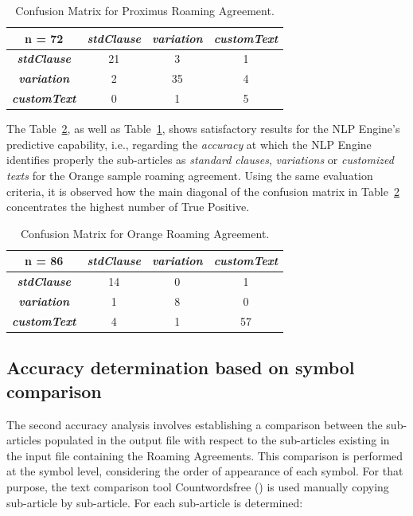 \documentclass[conference]{style/IEEEtran}
\begin{document}
\begin{table}[htbp]
\caption{Confusion Matrix for Proximus Roaming Agreement.}
\begin{center}
\begin{tabular}{|c|c|c|c|}
\hline
\textbf{n = 72} & \textbf{\textit{stdClause}}& \textbf{\textit{variation}}& \textbf{\textit{customText}} \\
\hline
\textbf{\textit{stdClause}}& 21 & 3 & 1 \\
\hline
\textbf{\textit{variation}}& 2 & 35 & 4 \\
\hline
\textbf{\textit{customText}}& 0 & 1 & 5 \\
\hline
\end{tabular}
\label{table1}
\end{center}
\end{table}

The Table~\ref{table2}, as well as Table~\ref{table1}, shows satisfactory results for the NLP Engine's predictive capability, i.e., regarding the \textit{accuracy} at which the NLP Engine identifies properly the sub-articles as \textit{standard clauses}, \textit{variations} or \textit{customized texts} for the Orange sample roaming agreement. Using the same evaluation criteria, it is observed how the main diagonal of the confusion matrix in Table~\ref{table2} concentrates the highest number of True Positive.

\begin{table}[htbp]
\caption{Confusion Matrix for Orange Roaming Agreement.}
\begin{center}
\begin{tabular}{|c|c|c|c|}
\hline
\textbf{n = 86} & \textbf{\textit{stdClause}}& \textbf{\textit{variation}}& \textbf{\textit{customText}} \\
\hline
\textbf{\textit{stdClause}}& 14 & 0 & 1 \\
\hline
\textbf{\textit{variation}}& 1 & 8 & 0 \\
\hline
\textbf{\textit{customText}}& 4 & 1 & 57 \\
\hline
\end{tabular}
\label{table2}
\end{center}
\end{table}

\subsection{Accuracy determination based on symbol comparison}
The second accuracy analysis involves establishing a comparison between the sub-articles populated in the output file with respect to the sub-articles existing in the input file containing the Roaming Agreements. This comparison is performed at the symbol level, considering the order of appearance of each symbol. For that purpose, the text comparison tool Countwordsfree (\cite{countwordsfree}) is used manually copying sub-article by sub-article. For each sub-article is determined:
\end{document}

